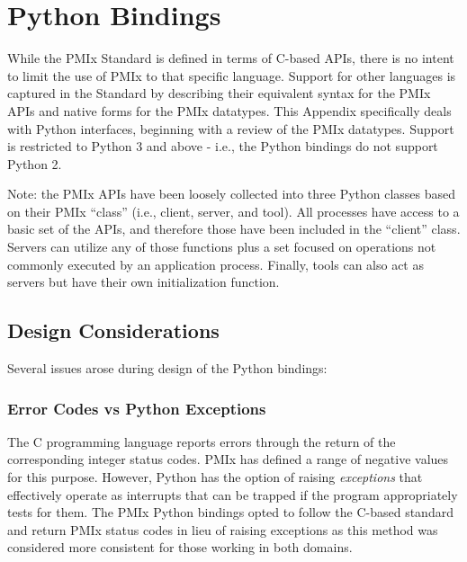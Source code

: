 \chapter{Python Bindings}
\label{app:python}

While the \ac{PMIx} Standard is defined in terms of C-based \acp{API}, there is no intent to limit the use of \ac{PMIx} to that specific language. Support for other languages is captured in the Standard by describing their equivalent syntax for the \ac{PMIx} \acp{API} and native forms for the \ac{PMIx} datatypes. This Appendix specifically deals with Python interfaces, beginning with a review of the \ac{PMIx} datatypes. Support is restricted to Python 3 and above - i.e., the Python bindings do not support Python 2.

Note: the \ac{PMIx} \acp{API} have been loosely collected into three Python classes based on their \ac{PMIx} “class” (i.e., client, server, and tool). All processes have access to a basic set of the \acp{API}, and therefore those have been included in the “client” class. Servers can utilize any of those functions plus a set focused on operations not commonly executed by an application process. Finally, tools can also act as servers but have their own initialization function.


\section{Design Considerations}
\label{app:python:design}

Several issues arose during design of the Python bindings:

\subsection{Error Codes vs Python Exceptions}
\label{app:python:exceptions}

The C programming language reports errors through the return of the corresponding integer status codes. \ac{PMIx} has defined a range of negative values for this purpose. However, Python has the option of raising \emph{exceptions} that effectively operate as interrupts that can be trapped if the program appropriately tests for them. The \ac{PMIx} Python bindings opted to follow the C-based standard and return \ac{PMIx} status codes in lieu of raising exceptions as this method was considered more consistent for those working in both domains.

